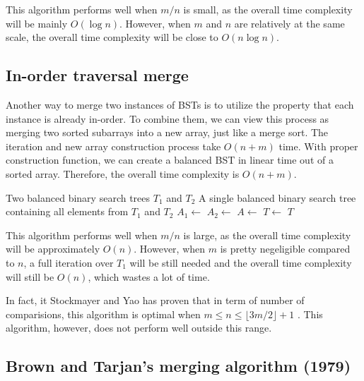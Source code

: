 \documentclass[12pt]{article}
\begin{document}
This algorithm performs well when $m/n$ is small, as the overall time complexity will be mainly $O(\log n)$. However, when $m$ and $n$ are relatively at the same scale, the overall time complexity will be close to $O(n\log n)$.

\subsection{In-order traversal merge}

Another way to merge two instances of BSTs is to utilize the property that each instance is already in-order. To combine them, we can view this process as merging two sorted subarrays into a new array, just like a merge sort. The iteration and new array construction process take $O(n+m)$ time. With proper construction function, we can create a balanced BST in linear time out of a sorted array. Therefore, the overall time complexity is $O(n+m)$.

\begin{tcolorbox}[colback=blue!5!white, colframe=blue!75!black, title=Algorithm: Merge-Sort-Based BST Merge]
\begin{algorithmic}[1]
\Require Two balanced binary search trees $T_1$ and $T_2$
\Ensure A single balanced binary search tree containing all elements from $T_1$ and $T_2$
    \State $A_1 \gets$ 
    \State $A_2 \gets$ 
    \State $A \gets$ 
    \State $T \gets$ 
    \State \Return $T$
\EndProcedure
\end{algorithmic}
\end{tcolorbox}

This algorithm performs well when $m/n$ is large, as the overall time complexity will be approximately $O(n)$. However, when $m$ is pretty negeligible compared to $n$, a full iteration over $T_1$ will be still needed and the overall time complexity will still be $O(n)$, which wastes a lot of time.

In fact, it Stockmayer and Yao has proven that in term of number of comparisions, this algorithm is optimal when $m\le n\le \lfloor 3m/2 \rfloor +1$ \cite{stockmeyer1980optimality}. This algorithm, however, does not perform well outside this range. 

\subsection{Brown and Tarjan's merging algorithm (1979)}
\end{document}
